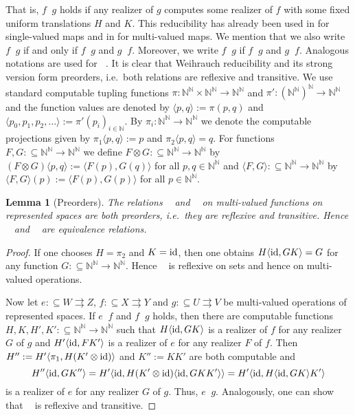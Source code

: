 \documentclass[jsl,10pt]{noasl}
\def\IN{{\mathbb{N}}}
\def\In{\subseteq}
\def\mto{\rightrightarrows}
\def\id{{\rm id}}
\def\leqW{\mathop{\leq_{\mathrm{W}}}}
\def\equivW{\mathop{\equiv_{\mathrm{W}}}}
\def\leqSW{\mathop{\leq_{\mathrm{sW}}}}
\def\equivSW{\mathop{\equiv_{\mathrm{sW}}}}
\def\nleqW{\mathop{\not\leq_{\mathrm{W}}}}
\def\lW{\mathop{<_{\mathrm{W}}}}
\def\nW{\mathop{|_{\mathrm{W}}}}
\newtheorem{lemma}[proposition]{Lemma}
\begin{document}
That is, $f\leqW g$ holds if any realizer of $g$ computes some realizer of $f$
with some fixed uniform translations $H$ and $K$.
This reducibility has already been used in \cite{Bra05} for single-valued
maps and in \cite{GM09} for multi-valued maps.
We mention that 
we also write $f\lW g$ if and only if $f\leqW g$
and $g\nleqW f$. Moreover, we write $f\nW g$ if $f\nleqW g$
and $g\nleqW f$. Analogous notations are used for $\leqSW$.
It is clear that Weihrauch reducibility and its strong version form 
preorders, i.e.\ both relations are reflexive and transitive.
We use standard computable tupling functions $\pi:\IN^\IN\times\IN^\IN\to\IN^\IN$
and $\pi':(\IN^\IN)^\IN\to\IN^\IN$ and the function values are denoted
by $\langle p,q\rangle:=\pi(p,q)$ and $\langle p_0,p_1,p_2,...\rangle:=\pi'(p_i)_{i\in\IN}$.
By $\pi_i:\IN^\IN\to\IN^\IN$ we denote the computable projections given by
$\pi_1\langle p,q\rangle:=p$ and $\pi_2\langle p,q\rangle=q$.
For functions $F,G:\In\IN^\IN\to\IN^\IN$ we define $F\otimes G:\In\IN^\IN\to\IN^\IN$
by $(F\otimes G)\langle p,q\rangle:=\langle F(p),G(q)\rangle$ for all $p,q\in\IN^\IN$
and $\langle F,G\rangle:\In\IN^\IN\to\IN^\IN$ by 
$\langle F,G\rangle(p):=\langle F(p),G(p)\rangle$ for all $p\in\IN^\IN$.

\begin{lemma}[Preorders]
\label{lem:preorder}
The relations $\leqW$ and $\leqSW$ on multi-valued functions on represented spaces 
are both preorders, i.e.\ they are reflexive and transitive.
Hence $\equivW$ and $\equivSW$ are equivalence relations.
\end{lemma}
\begin{proof}
If one chooses $H=\pi_2$
and $K=\id$, then one obtains $H\langle\id,GK\rangle=G$ for any function
$G:\In\IN^\IN\to\IN^\IN$. Hence $\leqW$ is reflexive on sets and hence on multi-valued
operations.

Now let $e:\In W\mto Z$, $f:\In X\mto Y$ and $g:\In U\mto V$ be 
multi-valued operations of represented spaces. If $e\leqW f$ and $f\leqW g$ holds,
then there are computable functions $H,K,H',K':\In\IN^\IN\to\IN^\IN$
such that $H\langle\id,GK\rangle$ is a realizer of $f$ for any realizer $G$ of $g$
and $H'\langle\id,FK'\rangle$ is a realizer of $e$ for any realizer $F$ of $f$.
Then $H'':=H'\langle\pi_1,H(K'\otimes\id)\rangle$ and $K'':=KK'$ are both computable and 
\[
H''\langle\id,GK''\rangle
= H'\langle\id,H(K'\otimes\id)\langle\id,GKK'\rangle\rangle
= H'\langle\id,H\langle\id,GK\rangle K'\rangle
\]
is a realizer of $e$ for any realizer $G$ of $g$. Thus, $e\leqW g$.
Analogously, one can show that $\leqSW$ is reflexive and transitive.
\end{proof}
\end{document}
